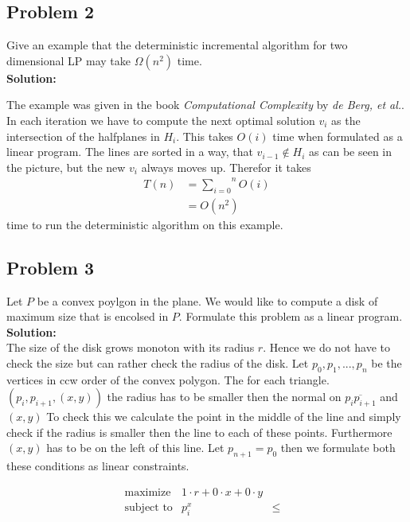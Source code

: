 \documentclass[11pt,a4paper,ngerman]{article}
\begin{document}
\subsection*{Problem 2}

Give an example that the deterministic incremental algorithm for two dimensional LP may take $\Omega(n^2)$ time.\\

\textbf{Solution:}\\

\vspace{15cm}

The example was given in the book \emph{Computational Complexity} by \emph{de Berg, et al.}. In each iteration we have to compute the next optimal solution $v_i$ as the intersection of the halfplanes in $H_i$. This takes $O(i)$ time when formulated as a linear program.
The lines are sorted in a way, that $v_{i-1} \not\in H_i$ as can be seen
in the picture, but the new $v_i$ always moves up. Therefor it takes
\begin{equation}\begin{split}
    T(n) &= \overset{n}{\underset{i=0}{\sum}} O(i)\\
        &= O(n^2)
\end{split}\end{equation}
time to run the deterministic algorithm on this example.

\subsection*{Problem 3}
Let $P$ be a convex poylgon in the plane. We would like to compute a disk
of maximum size that is encolsed in $P$. Formulate this problem as a linear
program.\\

\textbf{Solution:}\\

The size of the disk grows monoton with its radius $r$. Hence we do not have
to check the size but can rather check the radius of the disk.
Let $p_0, p_1, ..., p_n$ be the vertices in ccw order of the convex polygon.
The for each triangle. $(p_i, p_{i+1}, (x,y))$ the radius has to be smaller
then the normal on $\overline{p_ip_{i+1}}$ and $(x,y)$ To check this
we calculate the point in the middle of the line and simply check
if the radius is smaller then the line to each of these points. Furthermore
$(x,y)$ has to be on the left of this line. Let $p_{n+1}=p_0$ then we
formulate both these conditions as linear constraints.

\begin{equation}\label{alge:ueb6:disklp}\begin{array}{lrclr}
    \text{maximize} & 1 \cdot r + 0 \cdot x + 0 \cdot y\\
    \text{subject to} & p_i^x & \leq & \\
                & 
\end{array}\end{equation}

\label{LastPage}
\end{document}
